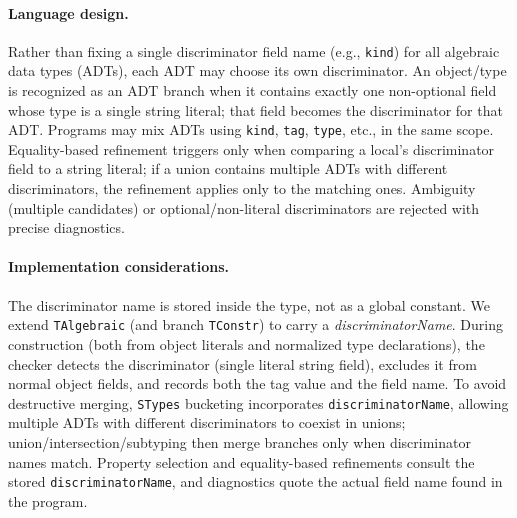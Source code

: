 \documentclass[11pt]{article}
\begin{document}
\paragraph{Language design.}
Rather than fixing a single discriminator field name (e.g., \texttt{kind}) for all algebraic data types (ADTs), each ADT may choose its own discriminator. An object/type is recognized as an ADT branch when it contains exactly one non-optional field whose type is a single string literal; that field becomes the discriminator for that ADT. Programs may mix ADTs using \texttt{kind}, \texttt{tag}, \texttt{type}, etc., in the same scope. Equality-based refinement triggers only when comparing a local's discriminator field to a string literal; if a union contains multiple ADTs with different discriminators, the refinement applies only to the matching ones. Ambiguity (multiple candidates) or optional/non-literal discriminators are rejected with precise diagnostics.

\paragraph{Implementation considerations.}
The discriminator name is stored inside the type, not as a global constant. We extend \texttt{TAlgebraic} (and branch \texttt{TConstr}) to carry a \emph{discriminatorName}. During construction (both from object literals and normalized type declarations), the checker detects the discriminator (single literal string field), excludes it from normal object fields, and records both the tag value and the field name. To avoid destructive merging, \texttt{STypes} bucketing incorporates \texttt{discriminatorName}, allowing multiple ADTs with different discriminators to coexist in unions; union/intersection/subtyping then merge branches only when discriminator names match. Property selection and equality-based refinements consult the stored \texttt{discriminatorName}, and diagnostics quote the actual field name found in the program.
\end{document}

